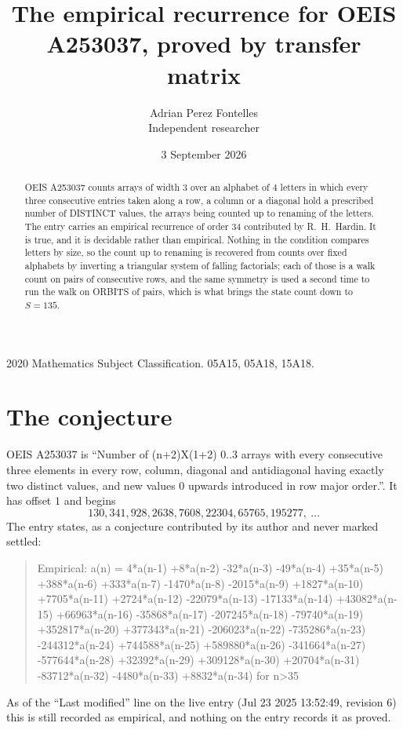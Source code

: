 \documentclass[11pt,a4paper]{article}
\title{The empirical recurrence for OEIS A253037, proved by transfer matrix}
\author{Adrian Perez Fontelles\\ \small Independent researcher}
\date{3 September 2026}
\theoremstyle{plain}
\theoremstyle{definition}
\begin{document}
\maketitle

\begin{abstract}
OEIS A253037 counts arrays of width $3$ over an alphabet of $4$ letters in which every three
consecutive entries taken along a row, a column or a diagonal hold a prescribed number of
DISTINCT values, the arrays being counted up to renaming of the letters. The entry carries an
empirical recurrence of order $34$ contributed by R.~H.~Hardin. It is true, and it is
decidable rather than empirical. Nothing in the condition compares letters by size, so the
count up to renaming is recovered from counts over fixed alphabets by inverting a triangular
system of falling factorials; each of those is a walk count on pairs of consecutive rows, and
the same symmetry is used a second time to run the walk on ORBITS of pairs, which is what
brings the state count down to $S=135$.
\end{abstract}

\noindent\small 2020 Mathematics Subject Classification. 05A15, 05A18, 15A18.\normalsize

\section{The conjecture}

OEIS A253037 is ``Number of (n+2)X(1+2) 0..3 arrays with every consecutive three elements in every row, column, diagonal and antidiagonal having exactly two distinct values, and new values 0 upwards introduced in row major order.''. It has offset $1$ and begins
\[
130, 341, 928, 2638, 7608, 22304, 65765, 195277,\ \dots
\]
The entry states, as a conjecture contributed by its author and never marked settled:
\begin{quote}
Empirical: a(n) = 4*a(n-1) +8*a(n-2) -32*a(n-3) -49*a(n-4) +35*a(n-5) +388*a(n-6) +333*a(n-7) -1470*a(n-8) -2015*a(n-9) +1827*a(n-10) +7705*a(n-11) +2724*a(n-12) -22079*a(n-13) -17133*a(n-14) +43082*a(n-15) +66963*a(n-16) -35868*a(n-17) -207245*a(n-18) -79740*a(n-19) +352817*a(n-20) +377343*a(n-21) -206023*a(n-22) -735286*a(n-23) -244312*a(n-24) +744588*a(n-25) +589880*a(n-26) -341664*a(n-27) -577644*a(n-28) +32392*a(n-29) +309128*a(n-30) +20704*a(n-31) -83712*a(n-32) -4480*a(n-33) +8832*a(n-34) for n>35
\end{quote}
As of the ``Last modified'' line on the live entry (Jul 23 2025 13:52:49, revision 6) this is still
recorded as empirical, and nothing on the entry records it as proved.
\end{document}
